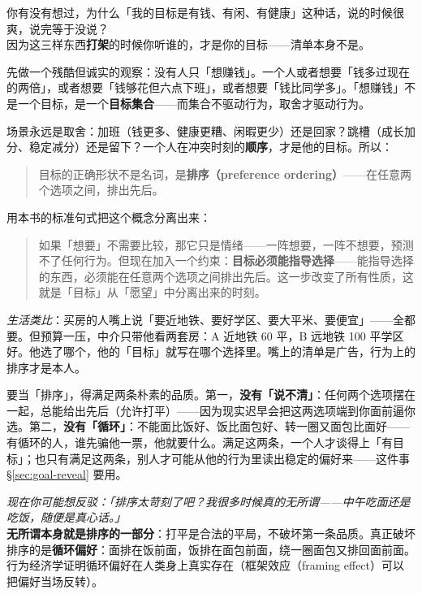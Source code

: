 \documentclass[../../main2.tex]{subfiles}
\begin{document}
	\begin{readingnote}
		你有没有想过，为什么「我的目标是有钱、有闲、有健康」这种话，说的时候很爽，说完等于没说？\\
		因为这三样东西\textbf{打架}的时候你听谁的，才是你的目标——清单本身不是。
	\end{readingnote}

	先做一个残酷但诚实的观察：没有人只「想赚钱」。一个人或者想要「钱多过现在的两倍」，或者想要「钱够花但六点下班」，或者想要「钱比同学多」。「想赚钱」不是一个目标，是一个\textbf{目标集合}——而集合不驱动行为，取舍才驱动行为。

	场景永远是取舍：加班（钱更多、健康更糟、闲暇更少）还是回家？跳槽（成长加分、稳定减分）还是留下？一个人在冲突时刻的\textbf{顺序}，才是他的目标。所以：

	\begin{quote}
		目标的正确形状不是名词，是\textbf{排序（preference ordering）}——在任意两个选项之间，排出先后。
	\end{quote}

	用本书的标准句式把这个概念分离出来：

	\begin{quote}
		如果「想要」不需要比较，那它只是情绪——一阵想要，一阵不想要，预测不了任何行为。但现在加入一个约束：\textbf{目标必须能指导选择}——能指导选择的东西，必须能在任意两个选项之间排出先后。这一步改变了所有性质，这就是「目标」从「愿望」中分离出来的时刻。
	\end{quote}

	\textit{生活类比}：买房的人嘴上说「要近地铁、要好学区、要大平米、要便宜」——全都要。但预算一压，中介只带他看两套房：A 近地铁 60 平，B 远地铁 100 平学区好。他选了哪个，他的「目标」就写在哪个选择里。嘴上的清单是广告，行为上的排序才是本人。

	要当「排序」，得满足两条朴素的品质。第一，\textbf{没有「说不清」}：任何两个选项摆在一起，总能给出先后（允许打平）——因为现实迟早会把这两选项端到你面前逼你选。第二，\textbf{没有「循环」}：不能面比饭好、饭比面包好、转一圈又面包比面好——有循环的人，谁先骗他一票，他就要什么。满足这两条，一个人才谈得上「有目标」；也只有满足这两条，别人才可能从他的行为里读出稳定的偏好来——这件事 §\ref{sec:goal-reveal} 要用。

	\begin{questionbox}
		\textit{现在你可能想反驳：「排序太苛刻了吧？我很多时候真的无所谓——中午吃面还是吃饭，随便是真心话。」}\\
		\textbf{无所谓本身就是排序的一部分}：打平是合法的平局，不破坏第一条品质。真正破坏排序的是\textbf{循环偏好}：面排在饭前面，饭排在面包前面，绕一圈面包又排回面前面。行为经济学证明循环偏好在人类身上真实存在（框架效应（framing effect）可以把偏好当场反转）。
	\end{questionbox}
\end{document}
